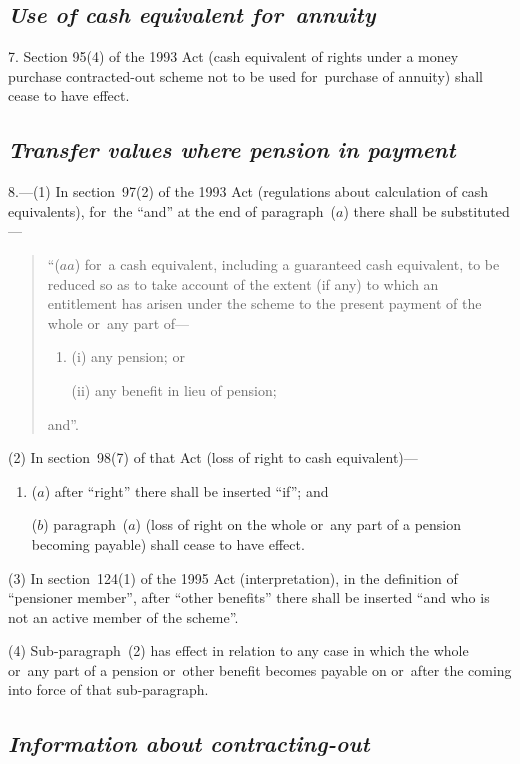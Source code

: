 \documentclass[12pt,a4paper]{article}
\begin{document}
\subsection*{\itshape Use of cash equivalent for~annuity}

7. Section 95(4)  of the 1993 Act (cash equivalent of rights under a money purchase contracted-out scheme not to be used for~purchase of annuity) shall cease to have effect.

\subsection*{\itshape Transfer values where pension in payment}

8.---(1) In section~97(2)  of the 1993 Act (regulations about calculation of cash equivalents), for~the “and” at the end of paragraph~($a$)  there shall be substituted—
\begin{quotation}
“($aa$) for~a cash equivalent, including a guaranteed cash equivalent, to be reduced so as to take account of the extent (if any) to which an entitlement has arisen under the scheme to the present payment of the whole or~any part of—
\begin{enumerate}\item[]
(i) any pension; or

(ii) any benefit in lieu of pension;
\end{enumerate}
and”.
\end{quotation}

(2) In section~98(7)  of that Act (loss of right to cash equivalent)—
\begin{enumerate}\item[]
($a$) after “right” there shall be inserted “if”; and

($b$) paragraph~($a$)  (loss of right on the whole or~any part of a pension becoming payable) shall cease to have effect.
\end{enumerate}

(3) In section~124(1)  of the 1995 Act (interpretation), in the definition of “pensioner member”, after “other benefits” there shall be inserted “and who is not an active member of the scheme”.

(4) Sub-paragraph~(2)  has effect in relation to any case in which the whole or~any part of a pension or~other benefit becomes payable on or~after the coming into force of that sub-paragraph.

\subsection*{\itshape Information about contracting-out}
\end{document}
